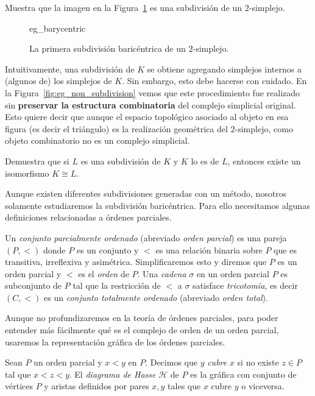 \documentclass{standalone}
\begin{document}
	\begin{exercise}
		Muestra que la imagen en la Figura~\ref{fig:eg_barycentric} es una subdivisión de un $2$-simplejo.
	\end{exercise}
	
	\begin{figure}
		\centering
		{eg_barycentric}
		\caption{La primera subdivisión baricéntrica de un $2$-simplejo.}
		\label{fig:eg_barycentric}
	\end{figure}
	
	Intuitivamente, una subdivisión de $K$ se obtiene agregando simplejos internos a (algunos de) los simplejos de $K$. Sin embargo, esto debe hacerse con cuidado. En la Figura~\ref{fig:eg_non_subdivision} vemos que este procedimiento fue realizado sin \textbf{preservar la estructura combinatoria} del complejo simplicial original. Esto quiere decir que aunque el espacio topológico asociado al objeto en esa figura (es decir el triángulo) es la realización geométrica del $2$-simplejo, como objeto combinatorio no es un complejo simplicial. 
	
	\begin{exercise}
		Demuestra que si $L$ es una subdivisión de $K$ y $K$ lo es de $L$, entonces existe un isomorfismo $K\cong L$.
	\end{exercise}

	Aunque existen diferentes subdivisiones generadas con un método, nosotros solamente estudiaremos la subdivisión baricéntrica. Para ello necesitamos algunas definiciones relacionadas a órdenes parciales.
	
	\begin{definition}\label{defn:poset}
		Un \emph{conjunto parcialmente ordenado} (abreviado \emph{orden parcial}) es una pareja $(P,<)$ donde $P$ es un conjunto y $<$ es una relación binaria sobre $P$ que es transitiva, irreflexiva y asimétrica. Simplificaremos esto y diremos que $P$ es un orden parcial y $<$ es el \emph{orden} de $P$. Una \emph{cadena} $\sigma$ en un orden parcial $P$ es subconjunto de $P$ tal que la restricción de $<$ a $
		\sigma$ satisface \emph{tricotomía}, es decir $(C,<)$ es un \emph{conjunto totalmente ordenado} (abreviado \emph{orden total}).
	\end{definition}
	Aunque no profundizaremos en la teoría de órdenes parciales, para poder entender más fácilmente qué es el complejo de orden de un orden parcial, usaremos la representación gráfica de los órdenes parciales. 
	\begin{definition}\label{defn:Hasse}
		Sean $P$ un orden parcial y $x<y$ en $P$. Decimos que $y$ \emph{cubre} $x$ si no existe $z\in P$ tal que $x<z<y$. El \emph{diagrama de Hasse} $\mathcal{H}$ de $P$ es la gráfica con conjunto de vértices $P$ y aristas definidos por pares ${x,y}$ tales que $x$ cubre $y$ o viceversa.
	\end{definition}
	
\end{document}
